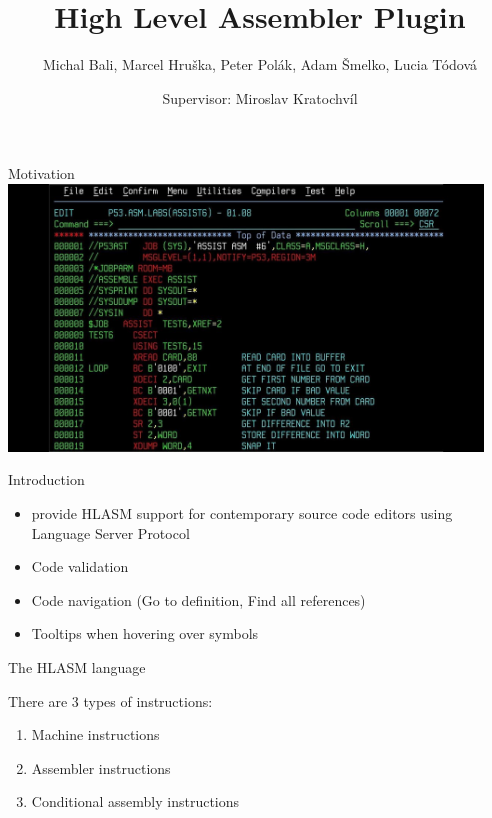 \documentclass[10pt]{beamer}
\title{High Level Assembler Plugin}
\subtitle{}
\date{Supervisor: Miroslav Kratochvíl}
\author{Michal Bali, Marcel Hruška, Peter Polák, Adam Šmelko, Lucia Tódová}
\begin{document}
\maketitle


\begin{frame}[fragile]{Motivation}
\centering
\hspace*{-1cm}
\includegraphics[width=12.6cm]{img/maxresdefault}

\end{frame}

\begin{frame}[fragile]{Introduction}

    \begin{itemize}
    	\item provide HLASM support for contemporary source code editors using Language Server Protocol
    	\item Code validation
    	\item Code navigation (Go to definition, Find all references)
    	\item Tooltips when hovering over symbols
    \end{itemize}
\end{frame}



\begin{frame}[fragile]{The HLASM language}

There are 3 types of instructions:
\begin{enumerate}
	\item Machine instructions
	\item Assembler instructions
	\item Conditional assembly instructions
\end{enumerate}


\end{frame}
\end{document}

